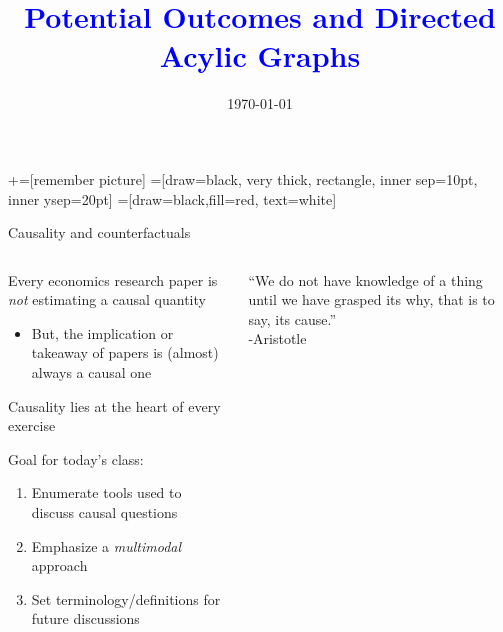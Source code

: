 \documentclass[notes,11pt, aspectratio=169]{beamer}
\title[]{\textcolor{blue}{Potential Outcomes and Directed Acylic Graphs}}
\author[PGP]{}
\institute[FRBNY]{\small{Paul Goldsmith-Pinkham}}
\date{\today}
\newenvironment{wideitemize}{\itemize\addtolength{\itemsep}{10pt}}{\enditemize}
\begin{document}
\newcommand\marktopleft[1]{%
    \tikz[overlay,remember picture] 
        \node (marker-#1-a) at (-.3em,.3em) {};%
}
\newcommand\markbottomright[2]{%
    \tikz[overlay,remember picture] 
        \node (marker-#1-b) at (0em,0em) {};%
}
+=[remember picture] 
 =[draw=black, very thick, rectangle, inner sep=10pt, inner ysep=20pt]
 =[draw=black,fill=red, text=white]

\begin{frame}
\maketitle

\end{frame}

\begin{frame}{Causality and counterfactuals}
\begin{columns}[T] %
\begin{column}{.58\textwidth}
  \begin{wideitemize}
  \item Every economics research paper
    is \emph{not} estimating a causal quantity
    \begin{itemize}
    \item But, the implication or takeaway of papers is (almost) always
      a causal one
    \end{itemize}
  \item Causality lies at the heart of every exercise
  \item Goal for today's class:
    \begin{enumerate}
    \item Enumerate tools used to discuss causal questions
    \item Emphasize a \emph{multimodal} approach
    \item Set terminology/definitions for future discussions
    \end{enumerate}
  \end{wideitemize}
\end{column}%
\hfill%
\begin{column}{.38\textwidth}
  \vfill
  ``We do not have knowledge of a thing until we have grasped its why, that is to say, its cause.''\\
\hfill  -Aristotle

\end{column}%
\end{columns}
\end{frame}
\end{document}
